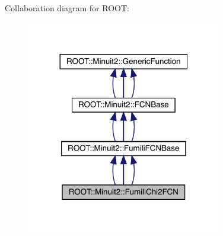 Collaboration diagram for R\+O\+OT\+:
\nopagebreak
\begin{figure}[H]
\begin{center}
\leavevmode
\includegraphics[width=240pt]{dd/d49/classROOT_1_1Minuit2_1_1FumiliChi2FCN__coll__graph}
\end{center}
\end{figure}
